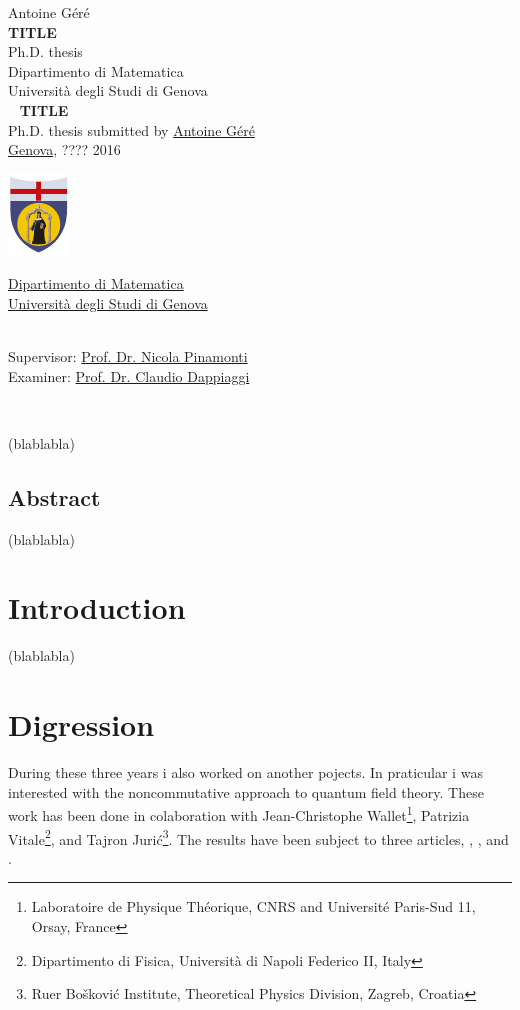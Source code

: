 \documentclass[11pt]{book}
\makeatletter
\newcommand*{\makepagetitle}{%
%
{\raggedright%
%
%
%
%
\thispagestyle{empty}%
%
\vspace*{50pt}
%
{\Large Antoine Géré}\\%
%
\vspace*{120pt}%
%
{\Huge\bfseries TITLE}\\[\baselineskip]%
%
\vspace*{60pt}%
%
{\Large Ph.D. thesis}\\[\baselineskip]%
%
\vspace*{80pt}%
%
{\Large Dipartimento di Matematica}\\[\baselineskip]%
%
\vspace*{1pt}
%
{\Large Università degli Studi di Genova}\\[\baselineskip]%
%
\vfill%
%
%
\newpage%
%
\thispagestyle{empty}%
%
\ \vfill%
%
%
\textbf{TITLE} \\[2pt] %
Ph.D. thesis submitted by \href{mailto:gere@dima.unige.it}{Antoine Géré} \\[1pt]
\href{http://www.comune.genova.it/}{Genova}, ???? 2016 \\[10pt]
%
%
\begin{minipage}{0.1\linewidth}
\includegraphics[scale=1]{unige.pdf}
\end{minipage}
%
\begin{minipage}{0.85\linewidth}
\href{http://www.dima.unige.it/}{Dipartimento di Matematica} \\[1pt]
\href{http://www.unige.it/}{Università degli Studi di Genova}
\end{minipage}
%
%
\vspace*{10pt} \\
Supervisor: \href{mailto:pinamont@dima.unige.it}{Prof. Dr. Nicola Pinamonti} \\[1pt]
%
Examiner: \href{mailto:claudio.dappiaggi@unipv.it}{Prof. Dr. Claudio Dappiaggi}
%
%
%
%
}%
%
}%
\theoremstyle{break}
\makeatother
\begin{document}




\makepagetitle




\newpage


\ \vfill


(blablabla)


\vfill


\newpage
\vspace*{100pt}
\section*{Abstract}


(blablabla)




\tableofcontents


\chapter*{Introduction}


(blablabla)

\chapter*{Digression}


During these three years i also worked on another pojects. In praticular i was interested with the noncommutative approach to quantum field theory. These work has been done in colaboration with Jean-Christophe Wallet\footnote{Laboratoire de Physique Th\'eorique, CNRS and Universit\'e Paris-Sud 11, Orsay, France}, Patrizia Vitale\footnote{Dipartimento di Fisica, Universit\`a di Napoli Federico II, Italy}, and Tajron Juri\'c\footnote{Ru\dj er Bo\v{s}kovi\'c Institute, Theoretical Physics Division, Zagreb, Croatia}. The results have been subject to three articles, \cite{gere_spectral_2014}, \cite{gere_noncommutative_2015}, and \cite{gere_quantum_2014}.
\end{document}
